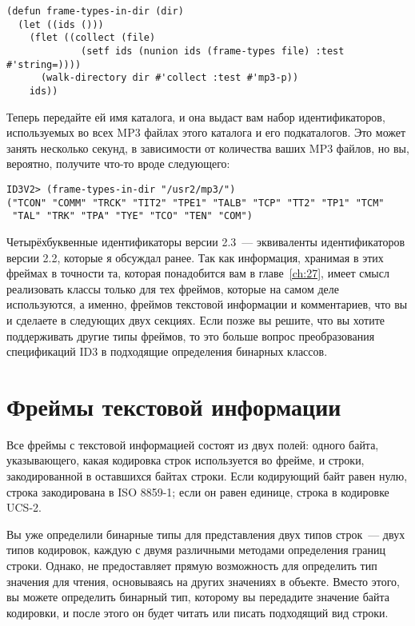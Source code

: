 \begin{lstlisting}
(defun frame-types-in-dir (dir)
  (let ((ids ()))
    (flet ((collect (file)
             (setf ids (nunion ids (frame-types file) :test #'string=))))
      (walk-directory dir #'collect :test #'mp3-p))
    ids))
\end{lstlisting}

Теперь передайте ей имя каталога, и она выдаст вам набор идентификаторов, используемых во
всех MP3 файлах этого каталога и его подкаталогов. Это может занять несколько секунд, в
зависимости от количества ваших MP3 файлов, но вы, вероятно, получите что-то вроде
следующего:

\begin{lstlisting}
ID3V2> (frame-types-in-dir "/usr2/mp3/")
("TCON" "COMM" "TRCK" "TIT2" "TPE1" "TALB" "TCP" "TT2" "TP1" "TCM"
 "TAL" "TRK" "TPA" "TYE" "TCO" "TEN" "COM")
\end{lstlisting}

Четырёхбуквенные идентификаторы версии 2.3~--- эквиваленты идентификаторов версии 2.2,
которые я обсуждал ранее. Так как информация, хранимая в этих фреймах в точности та,
которая понадобится вам в главе~\ref{ch:27}, имеет смысл реализовать классы только для тех
фреймов, которые на самом деле используются, а именно, фреймов текстовой информации и
комментариев, что вы и сделаете в следующих двух секциях. Если позже вы решите, что вы
хотите поддерживать другие типы фреймов, то это больше вопрос преобразования спецификаций
ID3 в подходящие определения бинарных классов.

\section{Фреймы текстовой информации}

Все фреймы с текстовой информацией состоят из двух полей: одного байта, указывающего,
какая кодировка строк используется во фрейме, и строки, закодированной в оставшихся байтах
строки. Если кодирующий байт равен нулю, строка закодирована в ISO 8859-1; если он равен
единице, строка в кодировке UCS-2.

Вы уже определили бинарные типы для представления двух типов строк~--- двух типов
кодировок, каждую с двумя различными методами определения границ строки. Однако,
 не предоставляет прямую возможность для определить тип значения
для чтения, основываясь на других значениях в объекте. Вместо этого, вы можете определить
бинарный тип, которому вы передадите значение байта кодировки, и после этого он будет
читать или писать подходящий вид строки.


